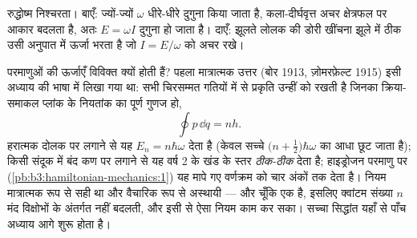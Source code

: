 \begin{omfigure}

{\small रुद्धोष्म निश्चरता। बाएँ: ज्यों-ज्यों $\omega$ धीरे-धीरे
दुगुना किया जाता है, कला-दीर्घवृत्त अचर क्षेत्रफल पर आकार बदलता है,
अतः $E = \omega I$ दुगुना हो जाता है। दाएँ: झूलते लोलक की डोरी खींचना
झूले में ठीक उसी अनुपात में ऊर्जा भरता है जो
$I = E/\omega$ को अचर रखे।}
\end{omfigure}

\begin{remark}[पुरानी क्वांटम सिद्धांत]\label{rem:b3:hamiltonian-mechanics:old-quantum}
परमाणुओं की ऊर्जाएँ विविक्त क्यों होती हैं? पहला मात्रात्मक उत्तर
(बोर 1913, ज़ोमरफ़ेल्ट 1915) इसी अध्याय की भाषा में लिखा गया था: सभी
चिरसम्मत गतियों में से प्रकृति उन्हीं को रखती है जिनका क्रिया-समाकल
प्लांक के नियतांक का पूर्ण गुणज हो,
\[
\oint p\,\dd q = nh .
\]
हरात्मक दोलक पर लगाने से यह $E_n = n\hbar\omega$ देता है
(केवल सच्चे $\big(n + \tfrac12\big)\hbar
\omega$ का आधा छूट जाता है); किसी संदूक में बंद कण पर लगाने से यह
वर्ष 2 के खंड के स्तर \emph{ठीक-ठीक} देता है; हाइड्रोजन परमाणु पर
(\cref{pb:b3:hamiltonian-mechanics:1}) यह मापे गए वर्णक्रम को चार अंकों
तक देता है। नियम मात्रात्मक रूप से सही था और वैचारिक रूप से
अस्थायी --- और चूँकि  एक  है, इसलिए
क्वांटम संख्या $n$ मंद विक्षोभों के अंतर्गत नहीं बदलती, और इसी से ऐसा
नियम काम कर सका। सच्चा सिद्धांत यहाँ से पाँच अध्याय आगे शुरू होता है।
\end{remark}

